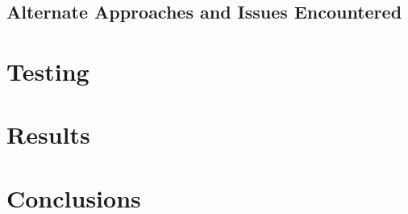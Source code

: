 \documentclass[]{article}
\begin{document}


\subsection{Alternate Approaches and Issues Encountered}

\section{Testing}

\section{Results}

\section{Conclusions}





\end{document}
